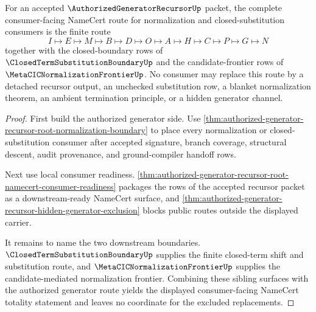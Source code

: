 \begin{theorem}
\label{thm:authorized-generator-recursor-consumer-namecert-totality}
For an accepted $\AuthorizedGeneratorRecursorUp$ packet, the complete consumer-facing NameCert route for normalization and closed-substitution consumers is the finite route
$$
I \longmapsto E \longmapsto M \longmapsto B \longmapsto D \longmapsto O \longmapsto A \longmapsto H \longmapsto C \longmapsto P \longmapsto G \longmapsto N
$$
together with the closed-boundary rows of $\ClosedTermSubstitutionBoundaryUp$ and the candidate-frontier rows of $\MetaCICNormalizationFrontierUp$. No consumer may replace this route by a detached recursor output, an unchecked substitution row, a blanket normalization theorem, an ambient termination principle, or a hidden generator channel.
\end{theorem}
\begin{proof}
First build the authorized generator side. Use \autoref{thm:authorized-generator-recursor-root-normalization-boundary} to place every normalization or closed-substitution consumer after accepted signature, branch coverage, structural descent, audit provenance, and ground-compiler handoff rows.

Next use local consumer readiness. \autoref{thm:authorized-generator-recursor-root-namecert-consumer-readiness} packages the rows of the accepted recursor packet as a downstream-ready NameCert surface, and \autoref{thm:authorized-generator-recursor-hidden-generator-exclusion} blocks public routes outside the displayed carrier.

It remains to name the two downstream boundaries. $\ClosedTermSubstitutionBoundaryUp$ supplies the finite closed-term shift and substitution route, and $\MetaCICNormalizationFrontierUp$ supplies the candidate-mediated normalization frontier. Combining these sibling surfaces with the authorized generator route yields the displayed consumer-facing NameCert totality statement and leaves no coordinate for the excluded replacements.
\end{proof}
